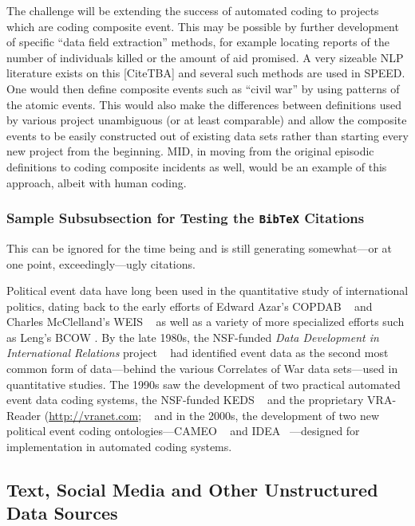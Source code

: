 \documentclass[graybox]{svmult}
\begin{document}
The challenge will be extending the success of automated coding to projects which are coding composite event. This may be possible by further development of specific ``data field extraction'' methods, for example locating reports of the number of individuals killed or the amount of aid promised. A very sizeable NLP literature exists on this [CiteTBA] and several such methods are used in SPEED. %
One would then define composite events such as ``civil war'' by using patterns of the atomic events. %
This would also make the differences between definitions used by various project unambiguous (or at least comparable) and  allow the composite events to be easily constructed out of existing data sets rather than starting every new project from the beginning. MID, in moving from the original episodic definitions to coding composite incidents as well, would be an example of this approach, albeit with human coding.

\subsubsection{Sample Subsubsection for Testing the \texttt{BibTeX} Citations}
\label{subsubsec:bibtex}

This can be ignored for the time being and is still generating somewhat---or at one point, exceedingly---ugly citations.

Political event data have long been used in the quantitative study of international politics, dating back to the early efforts of Edward Azar's COPDAB ~\cite{Azar80} and Charles McClelland's WEIS ~\cite{McClelland76} as well as a variety of more specialized efforts such as Leng's BCOW \cite{Leng87}. By the late 1980s, the NSF-funded \textit{Data Development in International Relations} project ~\cite{MMZ93} had identified event data as the second most common form of data---behind the various Correlates of War data sets---used in quantitative studies. The 1990s saw the development of two practical automated event data coding systems, the NSF-funded KEDS ~\cite{GSFW94, SchrodtGerner94} and the proprietary VRA-Reader (\url{http://vranet.com}; ~\cite{KingLowe04} and in the 2000s, the development of two new political event coding ontologies---CAMEO ~\cite{GSY09} and IDEA ~\cite{BBOJT03}---designed for implementation in automated coding systems.


\subsection{Text, Social Media and Other Unstructured Data Sources}
\label{subsec:socialmedia}
\end{document}
